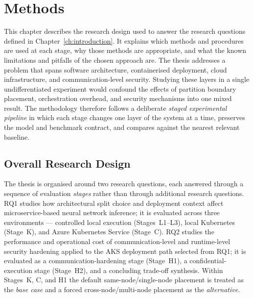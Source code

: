\chapter{Methods}
\label{ch:methods}

This chapter describes the research design used to answer the research questions
defined in Chapter~\ref{ch:introduction}.
It explains which methods and procedures are used at each stage, why those methods
are appropriate, and what the known limitations and pitfalls of the chosen approach
are.
The thesis addresses a problem that spans software architecture, containerised
deployment, cloud infrastructure, and communication-level security.
Studying these layers in a single undifferentiated experiment would confound the
effects of partition boundary placement, orchestration overhead, and security mechanisms
into one mixed result.
The methodology therefore follows a deliberate \emph{staged experimental pipeline}
in which each stage changes one layer of the system at a time, preserves the model
and benchmark contract, and compares against the nearest relevant baseline.

\section{Overall Research Design}
\label{sec:methods-design}

The thesis is organised around two research questions, each answered through a sequence
of evaluation \emph{stages} rather than through additional research questions. RQ1 studies
how architectural split choice and deployment context affect microservice-based neural
network inference; it is evaluated across three environments --- controlled local
execution (Stages~L1--L3), local Kubernetes (Stage~K), and Azure Kubernetes Service
(Stage~C). RQ2 studies the performance and operational cost of communication-level and
runtime-level security hardening applied to the AKS deployment path selected from RQ1;
it is evaluated as a communication-hardening stage (Stage~H1), a confidential-execution
stage (Stage~H2), and a concluding trade-off synthesis. Within Stages~K, C, and H1 the
default same-node/single-node placement is treated as the \emph{base case} and a forced
cross-node/multi-node placement as the \emph{alternative}.

